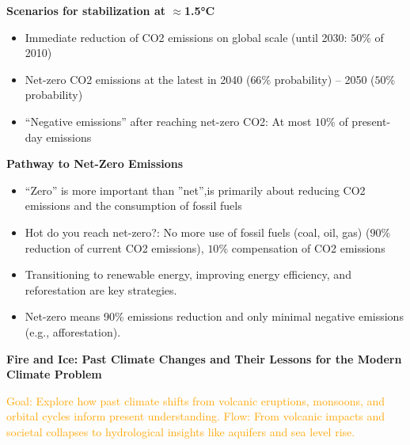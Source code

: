 \documentclass[fontsize=8pt, a4paper, landscape, fleqn]{scrartcl}
\renewcommand{\section}[1]{%
    \noindent\colorbox{sectioncolor}{%
        \parbox{\dimexpr\columnwidth-2\fboxsep}{\color{white}\textbf{#1}}}%
    \vspace{0.5mm}%
}
\renewcommand{\subsection}[1]{%
    \noindent\colorbox{subsectioncolor}{%
        \parbox{\dimexpr\columnwidth-2\fboxsep}{\color{white}\textbf{#1}}}%
    \vspace{0.5mm}%
}
\begin{document}
\begin{multicols*}{3}[\raggedcolumns]
\subsection{Scenarios for stabilization at $\approx$1.5°C}
\begin{itemize}
    \item Immediate reduction of CO2 emissions on global scale (until 2030: $50\%$ of 2010)
    \item Net-zero CO2 emissions at the latest in 2040 ($66\%$ probability) – 2050 ($50\%$ probability)
    \item “Negative emissions” after reaching net-zero CO2: At most $10\%$ of present- day emissions
\end{itemize}

\subsection{Pathway to Net-Zero Emissions}
\begin{itemize}
    \item “Zero” is more important than ”net”,is primarily about reducing CO2 emissions and the consumption of fossil fuels
    \item Hot do you reach net-zero?: No more use of fossil fuels (coal, oil, gas) ($90\%$ reduction of current CO2 emissions), $10\%$ compensation of CO2 emissions
    \item Transitioning to renewable energy, improving energy efficiency, and reforestation are key strategies.
    \item Net-zero means 90\% emissions reduction and only minimal negative emissions (e.g., afforestation).
\end{itemize}

\section{Fire and Ice: Past Climate Changes and Their Lessons for the Modern Climate Problem}
\noindent\textcolor{orange}{
Goal: Explore how past climate shifts from volcanic eruptions, monsoons, and orbital cycles inform present understanding.
Flow: From volcanic impacts and societal collapses to hydrological insights like aquifers and sea level rise.
}


\end{multicols*}
\end{document}
